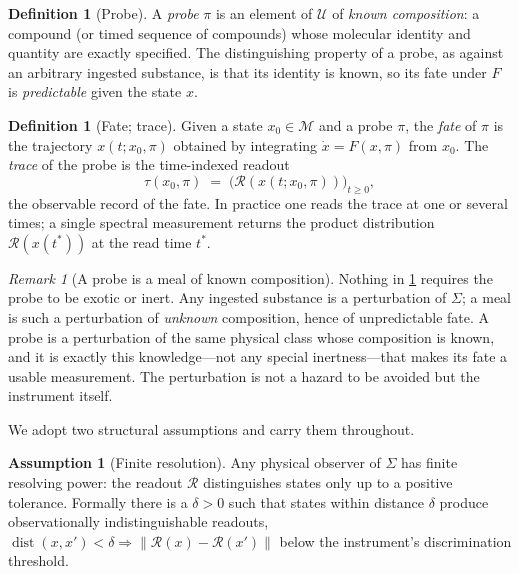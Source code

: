 \documentclass[11pt,a4paper]{article}
\theoremstyle{thmstyle}
\theoremstyle{definition}
\newtheorem{definition}[theorem]{Definition}
\newtheorem{assumption}{Assumption}
\theoremstyle{remark}
\newtheorem{remark}[theorem]{Remark}
\newcommand{\Man}{\mathcal{M}}          %
\newcommand{\st}{x}                     %
\newcommand{\fld}{F}                    %
\newcommand{\probe}{\pi}                %
\newcommand{\trace}{\tau}               %
\newcommand{\Rd}{\mathcal{R}}           %
\newcommand{\norm}[1]{\lVert#1\rVert}
\DeclareMathOperator{\dist}{dist}
\begin{document}
\begin{definition}[Probe]
\label{def:probe}
A \emph{probe} $\probe$ is an element of $\mathcal{U}$ of \emph{known
composition}: a compound (or timed sequence of compounds) whose molecular
identity and quantity are exactly specified. The distinguishing property
of a probe, as against an arbitrary ingested substance, is that its
identity is known, so its fate under $\fld$ is \emph{predictable} given
the state $\st$.
\end{definition}

\begin{definition}[Fate; trace]
\label{def:fate}
Given a state $\st_0\in\Man$ and a probe $\probe$, the \emph{fate} of
$\probe$ is the trajectory $\st(t;\st_0,\probe)$ obtained by integrating
$\dot\st=\fld(\st,\probe)$ from $\st_0$. The \emph{trace} of the probe is
the time-indexed readout
\[
\trace(\st_0,\probe)\;=\;\bigl(\Rd(\st(t;\st_0,\probe))\bigr)_{t\ge 0},
\]
the observable record of the fate. In practice one reads the trace at one
or several times; a single spectral measurement returns the product
distribution $\Rd(\st(t^\ast))$ at the read time $t^\ast$.
\end{definition}

\begin{remark}[A probe is a meal of known composition]
\label{rem:meal}
Nothing in \cref{def:probe} requires the probe to be exotic or inert. Any
ingested substance is a perturbation of $\Sigma$; a meal is such a
perturbation of \emph{unknown} composition, hence of unpredictable fate. A
probe is a perturbation of the same physical class whose composition is
known, and it is exactly this knowledge---not any special inertness---that
makes its fate a usable measurement. The perturbation is not a hazard to be
avoided but the instrument itself.
\end{remark}

We adopt two structural assumptions and carry them throughout.

\begin{assumption}[Finite resolution]
\label{ass:finite}
Any physical observer of $\Sigma$ has finite resolving power: the readout
$\Rd$ distinguishes states only up to a positive tolerance. Formally there
is a $\delta>0$ such that states within distance $\delta$ produce
observationally indistinguishable readouts,
$\dist(\st,\st')<\delta \Rightarrow \norm{\Rd(\st)-\Rd(\st')}$ below the
instrument's discrimination threshold.
\end{assumption}
\end{document}
